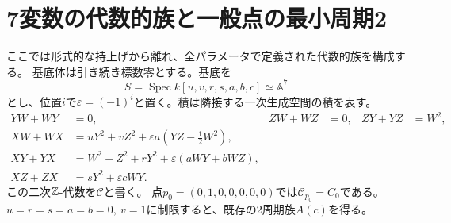 \section{7変数の代数的族と一般点の最小周期2}\label{sec:algebraic-family}
ここでは形式的な持上げから離れ、全パラメータで定義された代数的族を構成する。
基底体は引き続き標数零とする。基底を
\[
 S=\operatorname{Spec}k[u,v,r,s,a,b,c]\simeq\mathbb A^7
\]
とし、位置$i$で$\varepsilon=(-1)^i$と置く。積は隣接する一次生成空間の積を表す。
\begin{equation}\label{eq:seven-family}
\begin{aligned}
 YW+WY&=0,& ZW+WZ&=0,& ZY+YZ&=W^2,\\
 XW+WX&=uY^2+vZ^2+\varepsilon a(YZ-\tfrac12W^2),\\
 XY+YX&=W^2+Z^2+rY^2+\varepsilon(aWY+bWZ),\\
 XZ+ZX&=sY^2+\varepsilon cWY.
\end{aligned}
\end{equation}
この二次$\mathbb Z$-代数を$\mathcal C$と書く。
点$p_0=(0,1,0,0,0,0,0)$では$\mathcal C_{p_0}=C_0$である。
$u=r=s=a=b=0,\ v=1$に制限すると、既存の2周期族$A(c)$を得る。

